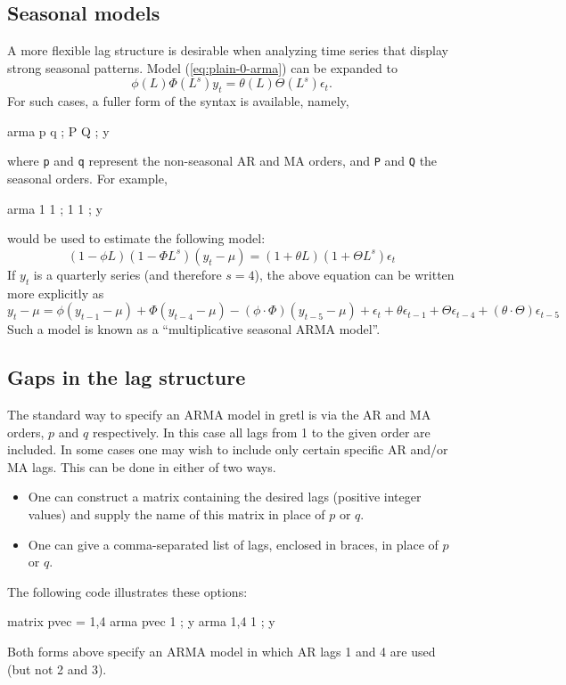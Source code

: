 \subsection{Seasonal models}

A more flexible lag structure is desirable when analyzing time series
that display strong seasonal patterns. Model (\ref{eq:plain-0-arma})
can be expanded to
\begin{equation}
  \label{eq:seasonal-arma}
  \phi(L) \Phi(L^s) y_t = \theta(L) \Theta(L^s) \epsilon_t .
\end{equation}
For such cases, a fuller form of the syntax is available, namely,
\begin{code}
arma p q ; P Q ; y
\end{code}
where \texttt{p} and \texttt{q} represent the non-seasonal AR and MA
orders, and \texttt{P} and \texttt{Q} the seasonal orders.  For
example,
\begin{code}
arma 1 1 ; 1 1 ; y
\end{code}
would be used to estimate the following model:
\[
  (1 -\phi L)(1 -\Phi L^s) (y_t - \mu) = (1 + \theta L)(1 + \Theta L^s) \epsilon_t
\]
If $y_t$ is a quarterly series (and therefore $s=4$), the above
equation can be written more explicitly as
\[
y_t - \mu = \phi (y_{t-1} - \mu) + \Phi (y_{t-4} - \mu) - (\phi
  \cdot \Phi) (y_{t-5} - \mu) + \epsilon_t + \theta \epsilon_{t-1} + \Theta
  \epsilon_{t-4} + (\theta \cdot \Theta) \epsilon_{t-5}
\]
Such a model is known as a ``multiplicative seasonal ARMA model''.


\subsection{Gaps in the lag structure}

The standard way to specify an ARMA model in gretl is via the AR
and MA orders, $p$ and $q$ respectively.  In this case all lags from 1
to the given order are included.  In some cases one may wish to
include only certain specific AR and/or MA lags.  This can be done in
either of two ways.
%
\begin{itemize}
\item One can construct a matrix containing the desired lags (positive
  integer values) and supply the name of this matrix in place of $p$
  or $q$.
\item One can give a comma-separated list of lags, enclosed in braces,
  in place of $p$ or $q$.
\end{itemize}
%
The following code illustrates these options:
%
\begin{code}
matrix pvec = {1,4}
arma pvec 1 ; y
arma {1,4} 1 ; y
\end{code}
%
Both forms above specify an ARMA model in which AR lags 1 and 4 are
used (but not 2 and 3). 

